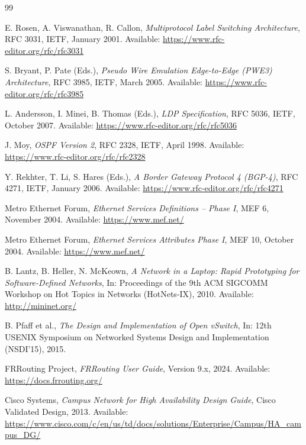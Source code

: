 \begin{thebibliography}{99}

E. Rosen, A. Viswanathan, R. Callon,
\textit{Multiprotocol Label Switching Architecture},
RFC 3031, IETF, January 2001.
Available: \url{https://www.rfc-editor.org/rfc/rfc3031}

S. Bryant, P. Pate (Eds.),
\textit{Pseudo Wire Emulation Edge-to-Edge (PWE3) Architecture},
RFC 3985, IETF, March 2005.
Available: \url{https://www.rfc-editor.org/rfc/rfc3985}

L. Andersson, I. Minei, B. Thomas (Eds.),
\textit{LDP Specification},
RFC 5036, IETF, October 2007.
Available: \url{https://www.rfc-editor.org/rfc/rfc5036}

J. Moy,
\textit{OSPF Version 2},
RFC 2328, IETF, April 1998.
Available: \url{https://www.rfc-editor.org/rfc/rfc2328}

Y. Rekhter, T. Li, S. Hares (Eds.),
\textit{A Border Gateway Protocol 4 (BGP-4)},
RFC 4271, IETF, January 2006.
Available: \url{https://www.rfc-editor.org/rfc/rfc4271}

Metro Ethernet Forum,
\textit{Ethernet Services Definitions -- Phase I},
MEF 6, November 2004.
Available: \url{https://www.mef.net/}

Metro Ethernet Forum,
\textit{Ethernet Services Attributes Phase I},
MEF 10, October 2004.
Available: \url{https://www.mef.net/}

B. Lantz, B. Heller, N. McKeown,
\textit{A Network in a Laptop: Rapid Prototyping for
Software-Defined Networks},
In: Proceedings of the 9th ACM SIGCOMM Workshop on Hot Topics
in Networks (HotNets-IX), 2010.
Available: \url{http://mininet.org/}

B. Pfaff et al.,
\textit{The Design and Implementation of Open vSwitch},
In: 12th USENIX Symposium on Networked Systems Design and
Implementation (NSDI'15), 2015.

FRRouting Project,
\textit{FRRouting User Guide}, Version 9.x, 2024.
Available: \url{https://docs.frrouting.org/}

Cisco Systems,
\textit{Campus Network for High Availability Design Guide},
Cisco Validated Design, 2013.
Available: \url{https://www.cisco.com/c/en/us/td/docs/solutions/Enterprise/Campus/HA_campus_DG/}


\end{thebibliography}
